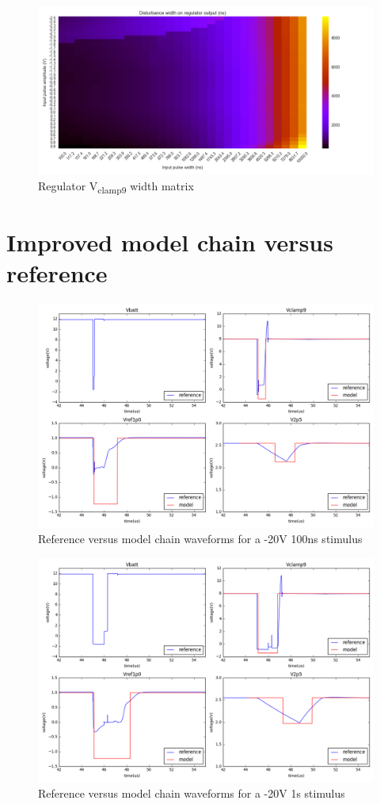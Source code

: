 \begin{figure}[!h]
  \centering
  \includegraphics[width=\textwidth]{src/4/figures/regulator_cz_v2_width.png}
  \caption{Regulator V\textsubscript{clamp9} width matrix}
  \label{fig:regu_width}
\end{figure}

\section{Improved model chain versus reference}
\label{apx:block-model-comparison}

\begin{figure}[!h]
  \centering
  \includegraphics[width=\textwidth]{src/4/figures/total_simulation_20V_100n_V2.png}
  \caption{Reference versus model chain waveforms for a -20V 100ns stimulus}
  \label{fig:reference_simu_v2_20V_100n}
\end{figure}


\begin{figure}[!h]
  \centering
  \includegraphics[width=\textwidth]{src/4/figures/total_simulation_20V_1u_V2.png}
  \caption{Reference versus model chain waveforms for a -20V 1\textmu{}s stimulus}
  \label{fig:reference_simu_v2_20V_100n}
\end{figure}
